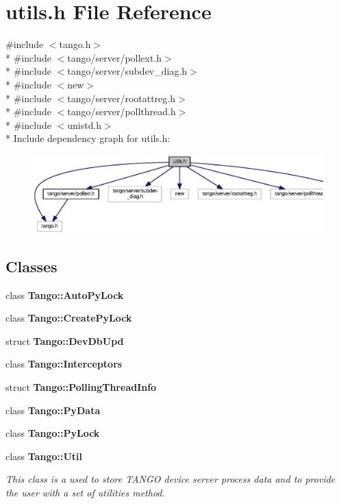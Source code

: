 \section{utils.\-h File Reference}
\label{utils_8h}
{\ttfamily \#include $<$tango.\-h$>$}\\*
{\ttfamily \#include $<$tango/server/pollext.\-h$>$}\\*
{\ttfamily \#include $<$tango/server/subdev\-\_\-diag.\-h$>$}\\*
{\ttfamily \#include $<$new$>$}\\*
{\ttfamily \#include $<$tango/server/rootattreg.\-h$>$}\\*
{\ttfamily \#include $<$tango/server/pollthread.\-h$>$}\\*
{\ttfamily \#include $<$unistd.\-h$>$}\\*
Include dependency graph for utils.\-h\-:
\nopagebreak
\begin{figure}[H]
\begin{center}
\leavevmode
\includegraphics[width=350pt]{db/d29/utils_8h__incl}
\end{center}
\end{figure}
\subsection*{Classes}
\begin{DoxyCompactItemize}
\item 
class {\bf Tango\-::\-Auto\-Py\-Lock}
\item 
class {\bf Tango\-::\-Create\-Py\-Lock}
\item 
struct {\bf Tango\-::\-Dev\-Db\-Upd}
\item 
class {\bf Tango\-::\-Interceptors}
\item 
struct {\bf Tango\-::\-Polling\-Thread\-Info}
\item 
class {\bf Tango\-::\-Py\-Data}
\item 
class {\bf Tango\-::\-Py\-Lock}
\item 
class {\bf Tango\-::\-Util}
\begin{DoxyCompactList}\small\item\em This class is a used to store T\-A\-N\-G\-O device server process data and to provide the user with a set of utilities method. \end{DoxyCompactList}\end{DoxyCompactItemize}
